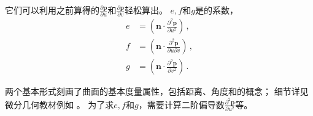 它们可以利用之前算得的$\displaystyle\frac{\partial \bm p}{\partial u}$和$\displaystyle\frac{\partial \bm p}{\partial v}$轻松算出。
$e,f$和$g$是的系数，
\begin{align*}
    e & =\left(\bm n\cdot\frac{\partial^2\bm p}{\partial u^2}\right)\, ,         \\
    f & =\left(\bm n\cdot\frac{\partial^2\bm p}{\partial u\partial v}\right)\, , \\
    g & =\left(\bm n\cdot\frac{\partial^2\bm p}{\partial v^2}\right)\, .
\end{align*}

两个基本形式刻画了曲面的基本度量属性，包括距离、角度和的概念；
细节详见微分几何教材例如\citet{gray2017modern}
。
为了求$e,f$和$g$，需要计算二阶偏导数$\displaystyle\frac{\partial^2\bm p}{\partial u^2}$等。

